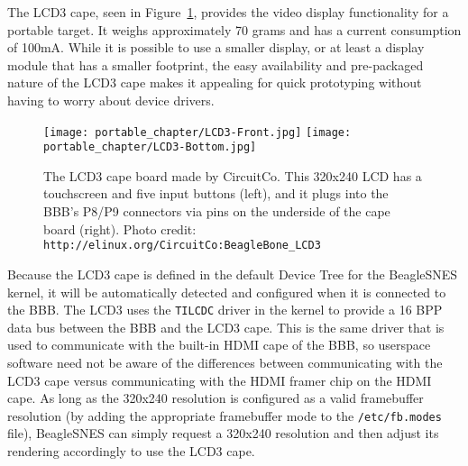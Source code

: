 The LCD3 cape, seen in Figure~\ref{fig:LCD3}, provides the video display functionality for a portable target.  It weighs approximately 70 grams and has a current consumption of 100mA.  While it is possible to use a smaller display, or at least a display module that has a smaller footprint, the easy availability and pre-packaged nature of the LCD3 cape makes it appealing for quick prototyping without having to worry about device drivers.  

\begin{figure}[h]
\centering\texttt{[image: portable\_chapter/LCD3-Front.jpg]} 
\texttt{[image: portable\_chapter/LCD3-Bottom.jpg]} 
\caption{The LCD3 cape board made by CircuitCo. This 320x240 LCD has a touchscreen and five input buttons (left), and it plugs into the BBB's P8/P9 connectors via pins on the underside of the cape board (right). Photo credit: \texttt{http://elinux.org/CircuitCo:BeagleBone\_LCD3}}\label{fig:LCD3}
\end{figure}

Because the LCD3 cape is defined in the default Device Tree for the BeagleSNES kernel, it will be automatically detected and configured when it is connected to the BBB. The LCD3 uses the \texttt{TILCDC} driver in the kernel to provide a 16 BPP data bus between the BBB and the LCD3 cape.  This is the same driver that is used to communicate with the built-in HDMI cape of the BBB, so userspace software need not be aware of the differences between communicating with the LCD3 cape versus communicating with the HDMI framer chip on the HDMI cape.  As long as the 320x240 resolution is configured as a valid framebuffer resolution (by adding the appropriate framebuffer mode to the \texttt{/etc/fb.modes} file), BeagleSNES can simply request a 320x240 resolution and then adjust its rendering accordingly to use the LCD3 cape.   


